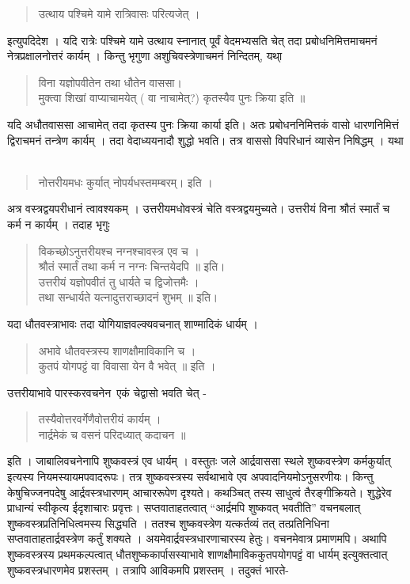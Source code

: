 \begin{verse}
उत्थाय पश्चिमे यामे रात्रिवासः परित्यजेत्  ।
\end{verse}
इत्युपदिदेश । यदि रात्रेः पश्चिमे यामे उत्थाय स्नानात् पूर्वं वेदमभ्यसति चेत् तदा प्रबोधनिमित्तमाचमनं नेत्रप्रक्षालनोत्तरं कार्यम् । किन्तु भृगुणा अशुचिवस्त्रेणाचमनं निन्दितम्, यथा् \
\begin{verse}
विना यज्ञोपवीतेन तथा धौतेन वाससा। \\
मुक्त्वा शिखां वाप्याचामयेत् ( वा नाचामेत्?) कृतस्यैव पुनः क्रिया इति ॥ 
\end{verse}
यदि अधौतवाससा आचामेत् तदा कृतस्य पुनः क्रिया कार्या इति। अतः प्रबोधननिमित्तकं वासो धारणनिमित्तं द्विराचमनं तन्त्रेण कार्यम् । तदा वेदाध्ययनादौ शुद्धो भवति। तत्र वाससो विपरिधानं व्यासेन निषिद्धम् । यथा \
\begin{verse}
नोत्तरीयमधः कुर्यात् नोपर्यधस्तमम्बरम्। इति । 
\end{verse}
अत्र वस्त्रद्वयपरीधानं त्वावश्यकम् । उत्तरीयमधोवस्त्रं चेति वस्त्रद्वयमुच्यते। उत्तरीयं विना श्रौतं स्मार्तं च कर्म न कार्यम् । तदाह भृगुः \ 
\begin{verse}
विकच्छोऽनुत्तरीयश्च नग्नश्चावस्त्र एव च । \\
श्रौतं स्मार्तं तथा कर्म न नग्नः चिन्तयेदपि ॥ इति। \\
उत्तरीयं यज्ञोपवीतं तु  धार्यते च द्विजोत्तमैः । \\
तथा सन्धार्यते यत्नादुत्तराच्छादनं शुभम् ॥ इति। 
\end{verse}
यदा धौतवस्त्राभावः तदा योगियाज्ञवल्क्यवचनात् शाण्मादिकं धार्यम् । 
\begin{verse}
अभावे धौतवस्त्रस्य शाणक्षौमाविकानि च ।\\
कुतपं योगपट्टं वा विवासा येन वै भवेत् ॥ इति । 
\end{verse}
उत्तरीयाभावे पारस्करवचनेन\ एकं चेद्वासो भवति चेत् -
\begin{verse}
तस्यैवोत्तरवर्गेणैवोत्तरीयं कार्यम् । \\
नार्द्रमेकं च वसनं परिदध्यात् कदाचन ॥ 
\end{verse}
इति । जाबालिवचनेनापि शुष्कवस्त्रं एव धार्यम् । वस्तुतः जले आर्द्रवाससा स्थले शुष्कवस्त्रेण कर्मकुर्यात् इत्यस्य नियमस्यायमपवादरूपः। तत्र शुष्कवस्त्रस्य सर्वथाभावे एव अपवादनियमोऽनुसरणीयः। किन्तु केषुचिज्जनपदेषु आर्द्रवस्त्रधारणम् आचाररूपेण दृश्यते। कथञ्चित् तस्य साधुत्वं तैरङ्गीक्रियते। शुद्धेरेव प्राधान्यं स्वीकृत्य ईदृशाचारः प्रवृत्तः। सप्तवाताहतत्वात् “आर्द्रमपि शुष्कवत् भवतीति” वचनबलात् शुष्कवस्त्रप्रतिनिधित्वमस्य सिद्ध्यति । ततश्च शुष्कवस्त्रेण यत्कर्तव्यं तत् तत्प्रतिनिधिना सप्तवाताहतार्द्रवस्त्रेण कर्तुं शक्यते । अयमेवार्द्रवस्त्रधारणाचारस्य हेतुः। वचनमेवात्र प्रमाणमपि। अथापि शुष्कवस्त्रस्य प्रथमकल्पत्वात् धौतशुष्ककार्पासस्याभावे शाणक्षौमाविककुतपयोगपट्टं वा धार्यम् इत्युक्तत्वात् शुष्कवस्त्रधारणमेव प्रशस्तम् । तत्रापि आविकमपि प्रशस्तम् । तदुक्तं भारते- 
